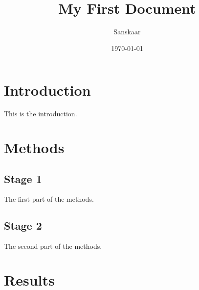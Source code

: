 \documentclass[a4paper,12pt]{article}
\begin{document}
	
	\title{My First Document}
	\author{Sanskaar}
	\date{\today}
	\maketitle
	\tableofcontents

	\newpage
	\section{Introduction}
	This is the introduction.
	\section{Methods}
	\subsection{Stage 1}

	The first part of the methods.
	\subsection{Stage 2}
	The second part of the methods.
	\section{Results}
\end{document}
